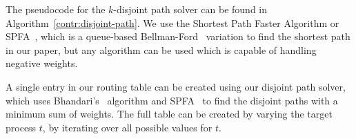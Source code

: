 The pseudocode for the $k$-disjoint path solver can be found in Algorithm~\ref{contr:disjoint-path}. We use the Shortest Path Faster Algorithm or SPFA~\cite{spfa-moore,spfa-fanding}, which is a queue-based Bellman-Ford~\cite{bf-bellman,bf-ford} variation to find the shortest path in our paper, but any algorithm can be used which is capable of handling negative weights. 

A single entry in our routing table can be created using our disjoint path solver, which uses Bhandari's~\cite{bhandari} algorithm and SPFA~\cite{spfa-moore,spfa-fanding} to find the disjoint paths with a minimum sum of weights. The full table can be created by varying the target process $t$, by iterating over all possible values for $t$.



